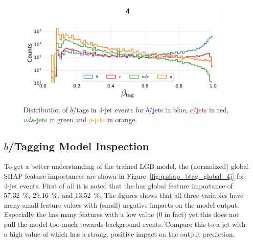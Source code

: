 \begin{figure}[h!]
  \centerfloat
  \includegraphics[width=0.95\textwidth, trim=15 15 15 50, clip]{figures/quarks/btag_scores_histogram_-njet=4-down_sample=1.00-ML_vars=vertex-selection=b-ejet_min=4-n_iter_RS_lgb=99-n_iter_RS_xgb=9-cdot_cut=0.90-version=19.pdf}
  \vspace{2mm}
  \caption[Distribution of $b$\=/Tags in 4-Jet Events]
          {Distribution of $b$\=/tags in 4-jet events for \textcolor{blue}{$b$\=/jets} in blue, \textcolor{red}{$c$\=/jets} in red, \textcolor{green}{$uds$-jets} in green and \textcolor{orange}{$g$-jets} in orange.} 
  \label{fig:q:btag_histogram_4j}
\end{figure}
\vspace{-5mm}

\subsection{$b$\=/Tagging Model Inspection}

To get a better understanding of the trained LGB model, the (normalized) global SHAP feature importances are shown in Figure~\ref{fig:q:shap_btag_global_4j} for 4-jet events. First of all it is noted that the  has global feature importance of \SI{57.32}{\percent},  \SI{29.16}{\percent}, and  \SI{13.52}{\percent}. The figures shows that all three variables have many small feature values with (small) negative impacts on the model output. Especially the  has many features with a low value (\num{0} in fact) yet this does not pull the model too much towards background events. Compare this to a jet with a high value of  which has a strong, positive impact on the output prediction.

